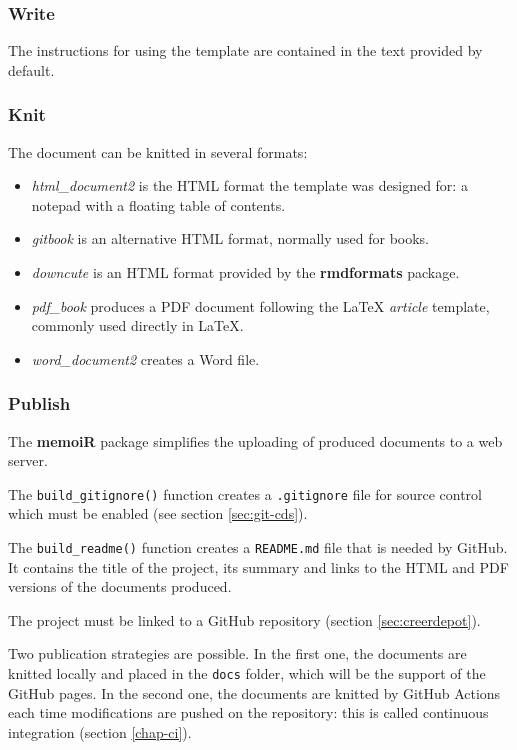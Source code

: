 \documentclass[
  12pt,
  american,
  a4paper,
  extrafontsizes,onecolumn,openright
  ]{memoir}
\providecommand{\tightlist}{%
  \setlength{\itemsep}{0pt}\setlength{\parskip}{0pt}}
\begin{document}
\subsubsection{Write}\label{write}

The instructions for using the template are contained in the text provided by default.

\subsubsection{Knit}\label{knit}

The document can be knitted in several formats:

\begin{itemize}
\tightlist
\item
  \emph{html\_document2} is the HTML format the template was designed for: a notepad with a floating table of contents.
\item
  \emph{gitbook} is an alternative HTML format, normally used for books.
\item
  \emph{downcute} is an HTML format provided by the \textbf{rmdformats} package.
\item
  \emph{pdf\_book} produces a PDF document following the LaTeX \emph{article} template, commonly used directly in LaTeX.
\item
  \emph{word\_document2} creates a Word file.
\end{itemize}

\subsubsection{Publish}\label{sec:article-en-ligne}

The \textbf{memoiR} package simplifies the uploading of produced documents to a web server.

The \texttt{build\_gitignore()} function creates a \texttt{.gitignore} file for source control which must be enabled (see section \ref{sec:git-cds}).

The \texttt{build\_readme()} function creates a \texttt{README.md} file that is needed by GitHub.
It contains the title of the project, its summary and links to the HTML and PDF versions of the documents produced.

The project must be linked to a GitHub repository (section \ref{sec:creerdepot}).

Two publication strategies are possible.
In the first one, the documents are knitted locally and placed in the \texttt{docs} folder, which will be the support of the GitHub pages.
In the second one, the documents are knitted by GitHub Actions each time modifications are pushed on the repository: this is called continuous integration (section \ref{chap-ci}).
\end{document}
